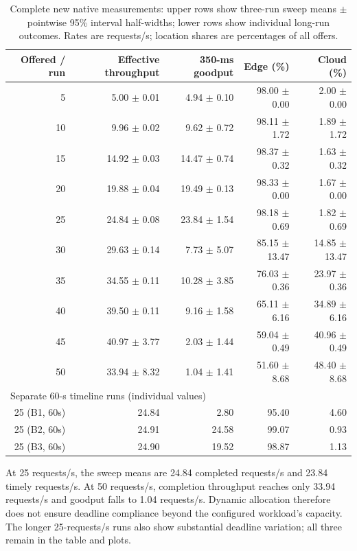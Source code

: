 \begin{table}[!htbp]
\centering\small
\caption{Complete new native measurements: upper rows show three-run sweep means $\pm$ pointwise 95\% interval half-widths; lower rows show individual long-run outcomes. Rates are requests/s; location shares are percentages of all offers.}
\label{tab:native-threefig}
\begin{tabular}{rrrrr}
\toprule
Offered / run & Effective throughput &350-ms goodput & Edge (\%) & Cloud (\%)\\
\midrule
5 & 5.00 $\pm$ 0.01 & 4.94 $\pm$ 0.10 & 98.00 $\pm$ 0.00 & 2.00 $\pm$ 0.00 \\
10 & 9.96 $\pm$ 0.02 & 9.62 $\pm$ 0.72 & 98.11 $\pm$ 1.72 & 1.89 $\pm$ 1.72 \\
15 & 14.92 $\pm$ 0.03 & 14.47 $\pm$ 0.74 & 98.37 $\pm$ 0.32 & 1.63 $\pm$ 0.32 \\
20 & 19.88 $\pm$ 0.04 & 19.49 $\pm$ 0.13 & 98.33 $\pm$ 0.00 & 1.67 $\pm$ 0.00 \\
25 & 24.84 $\pm$ 0.08 & 23.84 $\pm$ 1.54 & 98.18 $\pm$ 0.69 & 1.82 $\pm$ 0.69 \\
30 & 29.63 $\pm$ 0.14 & 7.73 $\pm$ 5.07 & 85.15 $\pm$ 13.47 & 14.85 $\pm$ 13.47 \\
35 & 34.55 $\pm$ 0.11 & 10.28 $\pm$ 3.85 & 76.03 $\pm$ 0.36 & 23.97 $\pm$ 0.36 \\
40 & 39.50 $\pm$ 0.11 & 9.16 $\pm$ 1.58 & 65.11 $\pm$ 6.16 & 34.89 $\pm$ 6.16 \\
45 & 40.97 $\pm$ 3.77 & 2.03 $\pm$ 1.44 & 59.04 $\pm$ 0.49 & 40.96 $\pm$ 0.49 \\
50 & 33.94 $\pm$ 8.32 & 1.04 $\pm$ 1.41 & 51.60 $\pm$ 8.68 & 48.40 $\pm$ 8.68 \\
\midrule
\multicolumn{5}{l}{Separate 60-s timeline runs (individual values)}\\
25 (B1, 60s) & 24.84 & 2.80 & 95.40 & 4.60 \\
25 (B2, 60s) & 24.91 & 24.58 & 99.07 & 0.93 \\
25 (B3, 60s) & 24.90 & 19.52 & 98.87 & 1.13 \\
\bottomrule
\end{tabular}
\end{table}

At 25 requests/s, the sweep means are 24.84 completed requests/s and 23.84 timely requests/s. At 50 requests/s, completion throughput reaches only 33.94 requests/s and goodput falls to 1.04 requests/s. Dynamic allocation therefore does not ensure deadline compliance beyond the configured workload's capacity. The longer 25-requests/s runs also show substantial deadline variation; all three remain in the table and plots.

